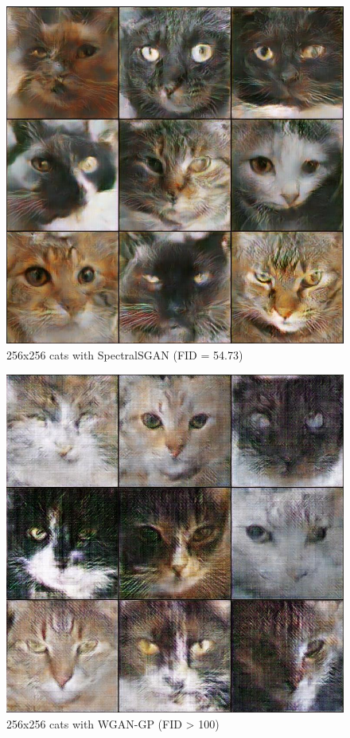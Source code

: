 \documentclass{article}
\begin{document}
\begin{figure}[H]
	\centering
	\includegraphics[width=390pt]{SpectralSGAN.jpeg}
	\caption{256x256 cats with SpectralSGAN (FID = 54.73)}
\end{figure}

\begin{figure}[H]
	\centering
	\includegraphics[width=390pt]{WGAN-GP.jpeg}
	\caption{256x256 cats with WGAN-GP (FID > 100)}
\end{figure}
\end{document}
